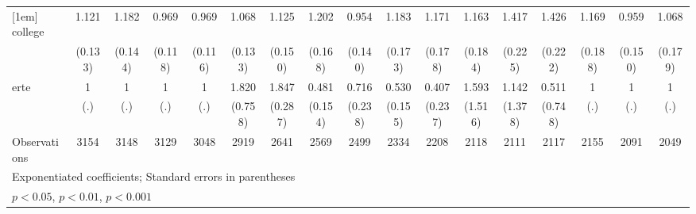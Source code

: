 {\begin{tabular}{l*{16}{c}}
[1em]
college             &       1.121         &       1.182         &       0.969         &       0.969         &       1.068         &       1.125         &       1.202         &       0.954         &       1.183         &       1.171         &       1.163         &       1.417\sym{*}  &       1.426\sym{*}  &       1.169         &       0.959         &       1.068         \\
                    &     (0.133)         &     (0.144)         &     (0.118)         &     (0.116)         &     (0.133)         &     (0.150)         &     (0.168)         &     (0.140)         &     (0.173)         &     (0.178)         &     (0.184)         &     (0.225)         &     (0.222)         &     (0.188)         &     (0.150)         &     (0.179)         \\
[1em]
erte                &           1         &           1         &           1         &           1         &       1.820         &       1.847\sym{***}&       0.481\sym{*}  &       0.716         &       0.530\sym{*}  &       0.407         &       1.593         &       1.142         &       0.511         &           1         &           1         &           1         \\
                    &         (.)         &         (.)         &         (.)         &         (.)         &     (0.758)         &     (0.287)         &     (0.154)         &     (0.238)         &     (0.155)         &     (0.237)         &     (1.516)         &     (1.378)         &     (0.748)         &         (.)         &         (.)         &         (.)         \\
\hline
Observations        &        3154         &        3148         &        3129         &        3048         &        2919         &        2641         &        2569         &        2499         &        2334         &        2208         &        2118         &        2111         &        2117         &        2155         &        2091         &        2049         \\
\hline\hline
\multicolumn{17}{l}{\footnotesize Exponentiated coefficients; Standard errors in parentheses}\\
\multicolumn{17}{l}{\footnotesize \sym{*} \(p<0.05\), \sym{**} \(p<0.01\), \sym{***} \(p<0.001\)}\\
\end{tabular}
}
